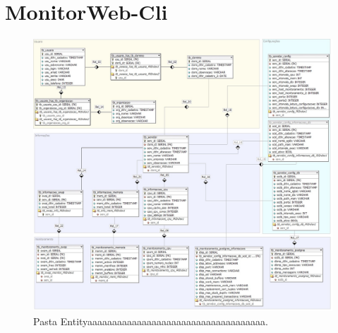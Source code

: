 \section{MonitorWeb-Cli}\label{sec:MonitorWeb-Cli}

\begin{figure}[H]
	\centering
	\includegraphics[width=1.0\textwidth]{figuras/diagramaBanco.jpg}
	\caption[Pasta Entitybbbbbbbbbbbbbbbbbbbbbbbbbbbbbbbbbb.]{Pasta Entityaaaaaaaaaaaaaaaaaaaaaaaaaaaaaaaaaaaa.}
	\label{Img:estruturaDePastaPojetoEntity}
	
\end{figure}


